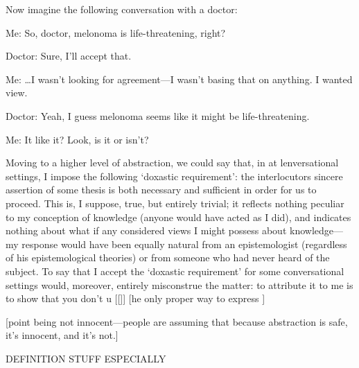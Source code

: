 \documentclass[11pt,letterpaper,oneside]{amsart} %
\begin{document}
Now imagine the following conversation with a doctor:\begin{squote}Me: So, doctor, melonoma is life-threatening, right?

Doctor: Sure, I'll accept that.

Me: \ldots I wasn't looking for agreement---I wasn't basing that on anything. I wanted  view.

Doctor: Yeah, I guess melonoma seems like it might be life-threatening.

Me: It  like it? Look, is it or isn't?\end{squote}Moving to a higher level of abstraction, we could say that, in at lenversational settings, I impose the following `doxastic requirement': the interlocutors sincere assertion of some thesis is both necessary and sufficient in order for us to proceed. This is, I suppose, true, but entirely trivial; it reflects nothing peculiar to my conception of knowledge (anyone would have acted as I did), and indicates nothing about what if any considered views I might possess about knowledge---my response would have been equally natural from an epistemologist (regardless of his epistemological theories) or from someone who had never heard of the subject. To say that I accept the `doxastic requirement' for some conversational settings would, moreover, entirely misconstrue the matter: to attribute it to me is to show that you don't u [[]] [he only proper way to express ]




[point being not innocent---people are assuming that because abstraction is safe, it's innocent, and it's not.]






DEFINITION STUFF ESPECIALLY
\end{document}
